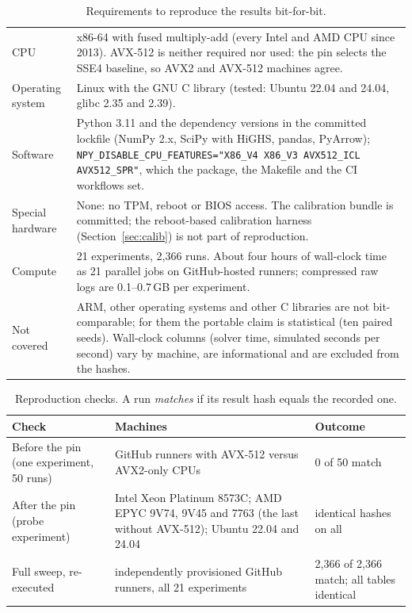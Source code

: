 \begin{table}[t]
\caption{Requirements to reproduce the results bit-for-bit.}
\label{tab:repro}
\centering\scriptsize
\begin{tabular}{@{}p{}p{}@{}}
\toprule
CPU & x86-64 with fused multiply-add (every Intel and AMD CPU since 2013). AVX-512 is neither required nor used: the pin selects the SSE4 baseline, so AVX2 and AVX-512 machines agree. \\
Operating system & Linux with the GNU C library (tested: Ubuntu 22.04 and 24.04, glibc 2.35 and 2.39). \\
Software & Python 3.11 and the dependency versions in the committed lockfile (NumPy 2.x, SciPy with HiGHS, pandas, PyArrow); \texttt{NPY\_DISABLE\_CPU\_FEATURES="X86\_V4 X86\_V3 AVX512\_ICL AVX512\_SPR"}, which the package, the Makefile and the CI workflows set. \\
Special hardware & None: no TPM, reboot or BIOS access. The calibration bundle is committed; the reboot-based calibration harness (Section~\ref{sec:calib}) is not part of reproduction. \\
Compute & 21 experiments, 2{,}366 runs. About four hours of wall-clock time as 21 parallel jobs on GitHub-hosted runners; compressed raw logs are 0.1--0.7\,GB per experiment. \\
Not covered & ARM, other operating systems and other C libraries are not bit-comparable; for them the portable claim is statistical (ten paired seeds). Wall-clock columns (solver time, simulated seconds per second) vary by machine, are informational and are excluded from the hashes. \\
\bottomrule
\end{tabular}
\end{table}

\begin{table}[t]
\caption{Reproduction checks. A run \emph{matches} if its result hash equals the recorded one.}
\label{tab:reprochecks}
\centering\scriptsize
\begin{tabular}{@{}p{}p{}p{}@{}}
\toprule
Check & Machines & Outcome \\
\midrule
Before the pin (one experiment, 50 runs) & GitHub runners with AVX-512 versus AVX2-only CPUs & 0 of 50 match \\
After the pin (probe experiment) & Intel Xeon Platinum 8573C; AMD EPYC 9V74, 9V45 and 7763 (the last without AVX-512); Ubuntu 22.04 and 24.04 & identical hashes on all \\
Full sweep, re-executed & independently provisioned GitHub runners, all 21 experiments & 2{,}366 of 2{,}366 match; all tables identical \\
\bottomrule
\end{tabular}
\end{table}

